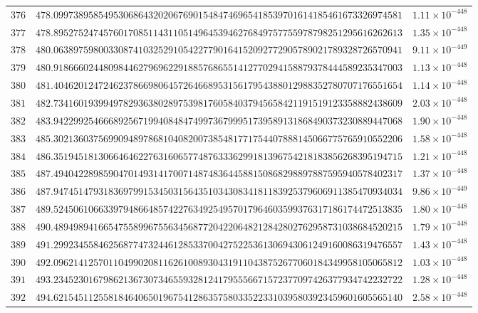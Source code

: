\documentclass[12pt,reqno]{amsart}
\theoremstyle{remark}
\begin{document}
\begin{longtable}{clc}
$376$ & $478.0997389585495306864320206769015484746965418539701614185461673326974581$ & $1.11\times 10^{-448}$ \\
$377$ & $478.8952752474576017085114311051496453946276849757755978798251295616262613$ & $1.35\times 10^{-448}$ \\
$378$ & $480.0638975980033087410325291054227790164152092772905789021789328726570941$ & $9.11\times 10^{-449}$ \\
$379$ & $480.9186660244809844627969622918857686551412770294158879378444589235347003$ & $1.13\times 10^{-448}$ \\
$380$ & $481.4046201247246237866980645726466895315617954388012988352780707176551654$ & $1.14\times 10^{-448}$ \\
$381$ & $482.7341601939949782936380289753981760584037945658421191519123358882438609$ & $2.03\times 10^{-448}$ \\
$382$ & $483.9422992546668925671994084847499736799951739589131868490373230889447068$ & $1.90\times 10^{-448}$ \\
$383$ & $485.3021360375699094897868104082007385481771754407888145066775765910552206$ & $1.58\times 10^{-448}$ \\
$384$ & $486.3519451813066464622763160657748763336299181396754218183856268395194715$ & $1.21\times 10^{-448}$ \\
$385$ & $487.4940422898590470149314170071487483644588150868298897887595940578402317$ & $1.37\times 10^{-448}$ \\
$386$ & $487.9474514793183697991534503156435103430834181183925379606911385470934034$ & $9.86\times 10^{-449}$ \\
$387$ & $489.5245061066339794866485742276349254957017964603599376317186174472513835$ & $1.80\times 10^{-448}$ \\
$388$ & $490.4894989416654755899675563456877204220648212842802762958731038684520215$ & $1.79\times 10^{-448}$ \\
$389$ & $491.2992345584625687747324461285337004275225361306943061249160086319476557$ & $1.43\times 10^{-448}$ \\
$390$ & $492.0962141257011049902081162610089304319110438752677060184349958105065812$ & $1.03\times 10^{-448}$ \\
$391$ & $493.2345230167986213673073465593281241795556671572377097426377934742232722$ & $1.28\times 10^{-448}$ \\
$392$ & $494.6215451125581846406501967541286357580335223310395803923459601605565140$ & $2.58\times 10^{-448}$ \\

\end{longtable}
\end{document}
